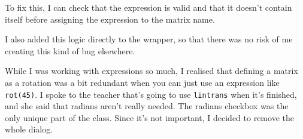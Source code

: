\documentclass[../development.tex]{subfiles}
\begin{document}
To fix this, I can check that the expression is valid and that it doesn't contain itself before assigning the expression to the matrix name.


I also added this logic directly to the wrapper, so that there was no risk of me creating this kind of bug elsewhere.


While I was working with expressions so much, I realised that defining a matrix as a rotation was a bit redundant when you can just use an expression like \texttt{rot(45)}. I spoke to the teacher that's going to use \texttt{lintrans} when it's finished, and she said that radians aren't really needed. The radians checkbox was the only unique part of the  class. Since it's not important, I decided to remove the whole dialog.
\end{document}
